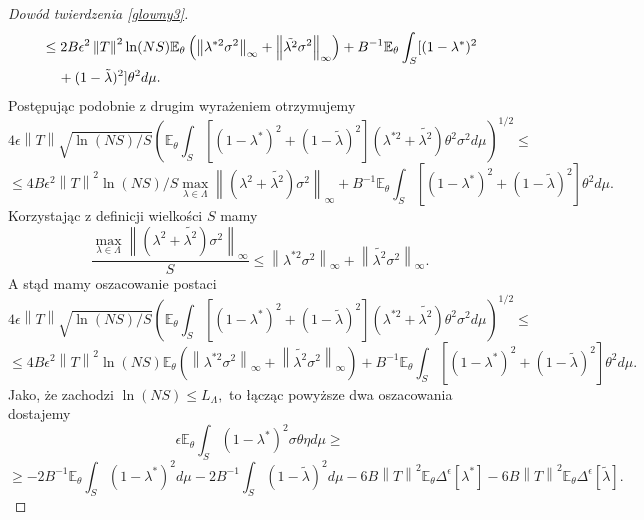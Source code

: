 \documentclass[man,mfiu]{mgrwms}
\newcommand{\norm}[1]{\left\lVert#1\right\rVert}
\begin{document}
\begin{proof}[Dowód twierdzenia \ref{glowny3}]
\begin{displaymath}
\begin{split}
&\leq 2B\epsilon^2\norm{T}^2 \ln (NS)\mathbb{E}_{\theta}\left(\norm{\lambda^{*2}\sigma^2}_{\infty}+\norm{\tilde{\lambda^2}\sigma^2}_{\infty}\right)+B^{-1}\mathbb{E}_{\theta}\int_S[(1-\lambda^*)^2\\
&\hspace{4mm}+(1-\tilde{\lambda})^2]\theta ^2d\mu.
\end{split}
\end{displaymath}
Postępując podobnie z drugim wyrażeniem otrzymujemy
\begin{displaymath}
4\epsilon\norm{T}\sqrt{\ln (NS)/S}\left(\mathbb{E}_{\theta}\int_S[(1-\lambda^*)^2+(1-\tilde{\lambda})^2](\lambda^{*2}+\tilde{\lambda^2})\theta ^2\sigma^2 d\mu\right)^{1/2}\leq
\end{displaymath}
\begin{displaymath}
\leq 4B\epsilon^2\norm{T}^2\ln (NS)/S\max_{\lambda\in \Lambda}\norm{(\lambda^{2}+\tilde{\lambda^2})\sigma^2}_{\infty}+B^{-1}\mathbb{E}_{\theta}\int_S[(1-\lambda^*)^2+(1-\tilde{\lambda})^2]\theta ^2d\mu.
\end{displaymath}
Korzystając z definicji wielkości $S$ mamy
\begin{displaymath}
\frac{\max_{\lambda\in \Lambda}\norm{(\lambda^{2}+\tilde{\lambda^2})\sigma^2}_{\infty}}{S}\leq 
\norm{\lambda^{*2}\sigma^2}_{\infty}+\norm{\tilde{\lambda^2}\sigma^2}_{\infty}.
\end{displaymath}
A stąd mamy oszacowanie postaci
\begin{displaymath}
4\epsilon\norm{T}\sqrt{\ln (NS)/S}\left(\mathbb{E}_{\theta}\int_S[(1-\lambda^*)^2+(1-\tilde{\lambda})^2](\lambda^{*2}+\tilde{\lambda^2})\theta ^2\sigma^2 d\mu\right)^{1/2}\leq
\end{displaymath}
\begin{displaymath}
\leq 4B\epsilon^2\norm{T}^2 \ln (NS)\mathbb{E}_{\theta}\left(\norm{\lambda^{*2}\sigma^2}_{\infty}+\norm{\tilde{\lambda^2}\sigma^2}_{\infty}\right)+B^{-1}\mathbb{E}_{\theta}\int_S[(1-\lambda^*)^2+(1-\tilde{\lambda})^2]\theta ^2d\mu.
\end{displaymath}
Jako, że zachodzi 
$\ln (NS)\leq L_{\Lambda},$
to łącząc powyższe dwa oszacowania dostajemy 
\begin{displaymath}
\epsilon\mathbb{E}_{\theta}\int_S(1-\lambda^*)^2\sigma\theta \eta d\mu\geq 
\end{displaymath}
\begin{displaymath}
\geq -2B^{-1}\mathbb{E}_{\theta}\int_S(1-\lambda^*)^2d\mu-2B^{-1}\int_S(1-\tilde{\lambda})^2d\mu-6B\norm{T}^2\mathbb{E}_{\theta}\Delta^{\epsilon}[\lambda^*]-6B\norm{T}^2\mathbb{E}_{\theta}\Delta^{\epsilon}[\tilde{\lambda}].
\end{displaymath}


\end{proof}
\end{document}
